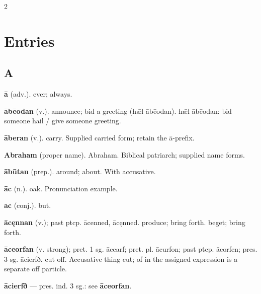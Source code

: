 \begin{multicols*}{2}
\section*{Entries}
\subsection*{A}
\textbf{ā} (adv.). ever; always.\par
\textbf{ābēodan} (v.). announce; bid a greeting (hǣl ābēodan). hǣl ābēodan: bid someone hail / give someone greeting.\par
\textbf{āberan} (v.). carry. Supplied carried form; retain the ā-prefix.\par
\textbf{Abraham} (proper name). Abraham. Biblical patriarch; supplied name forms.\par
\textbf{ābūtan} (prep.). around; about. With accusative.\par
\textbf{āc} (n.). oak. Pronunciation example.\par
\textbf{ac} (conj.). but.\par
\textbf{ācęnnan} (v.); past ptcp. ācenned, ācęnned. produce; bring forth. beget; bring forth.\par
\textbf{āceorfan} (v. strong); pret. 1 sg. ācearf; pret. pl. ācurfon; past ptcp. ācorfen; pres. 3 sg. ācierfð. cut off. Accusative thing cut; of in the assigned expression is a separate off particle.\par
\textbf{ācierfð} — pres. ind. 3 sg.: see \textbf{āceorfan}.\par

\end{multicols*}

